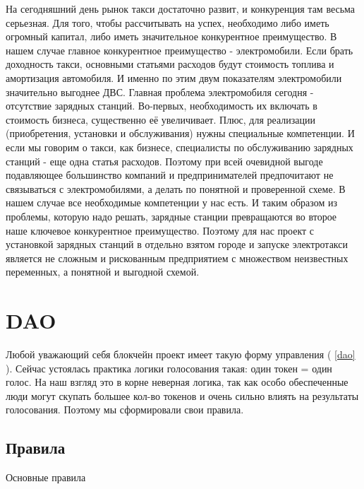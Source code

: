 \documentclass[a4paper,12pt]{report}
\begin{document}
На сегодняшний день рынок такси достаточно развит, и конкуренция там весьма серьезная. Для того, чтобы рассчитывать на успех, необходимо либо иметь огромный капитал, либо иметь значительное конкурентное преимущество. В нашем случае главное конкурентное преимущество - электромобили.
Если брать доходность такси, основными статьями расходов будут стоимость топлива и амортизация автомобиля. И именно по этим двум показателям электромобили значительно выгоднее ДВС.
Главная проблема электромобиля сегодня - отсутствие зарядных станций. Во-первых, необходимость их включать в стоимость бизнеса, существенно её увеличивает. Плюс, для реализации (приобретения, установки и обслуживания) нужны специальные компетенции. И если мы говорим о такси, как бизнесе, специалисты по обслуживанию зарядных станций - еще одна статья расходов.
Поэтому при всей очевидной выгоде подавляющее большинство компаний и предпринимателей предпочитают не связываться с электромобилями, а делать по понятной и проверенной схеме. 
В нашем случае все необходимые компетенции у нас есть. И таким образом из проблемы, которую надо решать, зарядные станции превращаются во второе наше ключевое конкурентное преимущество. 
Поэтому для нас проект с установкой зарядных станций в отдельно взятом городе и запуске электротакси является не сложным и рискованным предприятием с множеством неизвестных переменных, а понятной и выгодной схемой.


\chapter{DAO}

Любой уважающий себя блокчейн проект имеет такую форму управления ( \ref{dao} ). Сейчас устоялась практика логики голосования такая: один токен = один голос. На наш взгляд это в корне неверная логика, так как особо обеспеченные люди могут скупать большее кол-во токенов и очень сильно влиять на результаты голосования. Поэтому мы сформировали свои правила.

\section{Правила}

Основные правила
\end{document}
